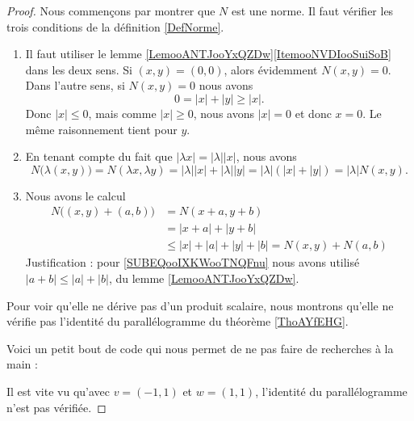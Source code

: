 \begin{proof}
	Nous commençons par montrer que \( N\) est une norme. Il faut vérifier les trois conditions de la définition \ref{DefNorme}.
	\begin{enumerate}
		\item
		      Il faut utiliser le lemme \ref{LemooANTJooYxQZDw}\ref{ItemooNVDIooSuiSoB} dans les deux sens. Si \( (x,y)=(0,0)\), alors évidemment \( N(x,y)=0\). Dans l'autre sens, si \( N(x,y)=0\) nous avons
		      \begin{equation}
			      0=| x |+| y |\geq | x |.
		      \end{equation}
		      Donc \( | x |\leq 0\), mais comme \( | x |\geq 0\), nous avons \( | x |=0\) et donc \( x=0\). Le même raisonnement tient pour \( y\).
		\item
		      En tenant compte du fait que \( | \lambda x |=| \lambda | |x |\), nous avons
		      \begin{equation}
			      N\big( \lambda(x,y) \big)=N(\lambda x,\lambda y)=| \lambda | |x |+| \lambda | |y |=| \lambda |(| x |+| y |)=| \lambda |N(x,y).
		      \end{equation}
		\item
		      Nous avons le calcul
		      \begin{subequations}
			      \begin{align}
				      N\big( (x,y)+(a,b) \big) & =N(x+a,y+b)                                                                 \\
				                               & =| x+a |+| y+b |                                                            \\
				                               & \leq | x |+| a |+| y |+| b |     \label{SUBEQooIXKWooTNQFnu} =N(x,y)+N(a,b)
			      \end{align}
		      \end{subequations}
		      Justification : pour \eqref{SUBEQooIXKWooTNQFnu} nous avons utilisé \( | a+b |\leq | a |+| b |\), du lemme \ref{LemooANTJooYxQZDw}.
	\end{enumerate}
	Pour voir qu'elle ne dérive pas d'un produit scalaire, nous montrons qu'elle ne vérifie pas l'identité du parallélogramme du théorème \ref{ThoAYfEHG}.

	Voici un petit bout de code qui nous permet de ne pas faire de recherches à la main :
	

	Il est vite vu qu'avec \( v=(-1,1)\) et \( w=(1,1)\), l'identité du parallélogramme n'est pas vérifiée.
\end{proof}

